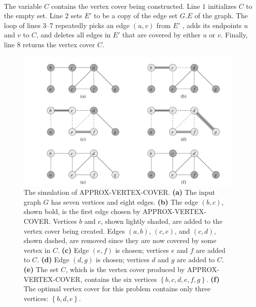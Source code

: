 \documentclass[12pt, a4paper]{article}
\begin{document}
	~\newline
	\par The variable ${C}$ contains the vertex cover being constructed. Line $1$ initializes ${C}$ to the empty set. Line $2$ sets ${E'}$ to be a copy of the edge set ${G.E}$ of
	the graph. The loop of lines 3–7 repeatedly picks an edge ${\left(u,v\right)}$ from ${E'}$
	, adds its endpoints ${u}$ and ${v}$ to ${C}$, and deletes all edges in ${E'}$ that are covered by either ${u}$
	or ${v}$. Finally, line $8$ returns the vertex cover ${C}$.
	\pagebreak
	\begin{figure}[h]
		\includegraphics[width=1\textwidth]{ApproxGraph.png}
		\caption{The simulation of APPROX-VERTEX-COVER. \textbf{(a)} The input graph $G$ has seven
			vertices and eight edges. \textbf{(b)} The edge $\left(b,c\right)$, shown bold, is the first edge chosen by APPROX-VERTEX-COVER. Vertices $b$ and $c$, shown lightly shaded, are added to the vertex cover
			being created. Edges $\left(a,b\right)$, $\left(c,e\right)$, and $\left(c,d\right)$, shown dashed, are removed since they are now covered
			by some vertex in $C$. \textbf{(c)} Edge $\left(e,f\right)$ is chosen; vertices $e$ and $f$ are added to $C$. \textbf{(d)} Edge $\left(d,g\right)$
			is chosen; vertices $d$ and $g$ are added to $C$. \textbf{(e)} The set $C$, which is the vertex cover produced by
			APPROX-VERTEX-COVER, contains the six vertices $\left\{b, c, d, e, f, g\right\}$. \textbf{(f)} The optimal vertex cover for
			this problem contains only three vertices: $\left\{b, d, e\right\}$.}
	\end{figure}
	\pagebreak
\end{document}
